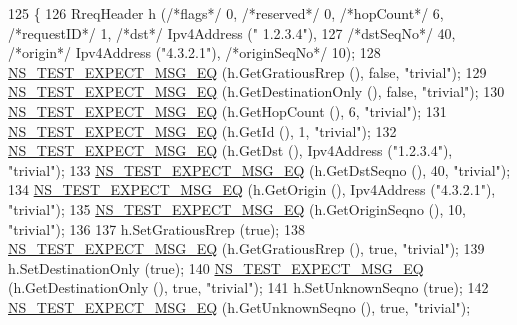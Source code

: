 \begin{DoxyCode}
125   \{
126     RreqHeader h (\textcolor{comment}{/*flags*/} 0, \textcolor{comment}{/*reserved*/} 0, \textcolor{comment}{/*hopCount*/} 6, \textcolor{comment}{/*requestID*/} 1, \textcolor{comment}{/*dst*/} Ipv4Address (\textcolor{stringliteral}{"
      1.2.3.4"}),
127                             \textcolor{comment}{/*dstSeqNo*/} 40, \textcolor{comment}{/*origin*/} Ipv4Address (\textcolor{stringliteral}{"4.3.2.1"}), \textcolor{comment}{/*originSeqNo*/} 10);
128     \hyperlink{group__testing_ga7304ba46a28d8cf08dfdfd6499cf7068}{NS\_TEST\_EXPECT\_MSG\_EQ} (h.GetGratiousRrep (), \textcolor{keyword}{false}, \textcolor{stringliteral}{"trivial"});
129     \hyperlink{group__testing_ga7304ba46a28d8cf08dfdfd6499cf7068}{NS\_TEST\_EXPECT\_MSG\_EQ} (h.GetDestinationOnly (), \textcolor{keyword}{false}, \textcolor{stringliteral}{"trivial"});
130     \hyperlink{group__testing_ga7304ba46a28d8cf08dfdfd6499cf7068}{NS\_TEST\_EXPECT\_MSG\_EQ} (h.GetHopCount (), 6, \textcolor{stringliteral}{"trivial"});
131     \hyperlink{group__testing_ga7304ba46a28d8cf08dfdfd6499cf7068}{NS\_TEST\_EXPECT\_MSG\_EQ} (h.GetId (), 1, \textcolor{stringliteral}{"trivial"});
132     \hyperlink{group__testing_ga7304ba46a28d8cf08dfdfd6499cf7068}{NS\_TEST\_EXPECT\_MSG\_EQ} (h.GetDst (), Ipv4Address (\textcolor{stringliteral}{"1.2.3.4"}), \textcolor{stringliteral}{"trivial"});
133     \hyperlink{group__testing_ga7304ba46a28d8cf08dfdfd6499cf7068}{NS\_TEST\_EXPECT\_MSG\_EQ} (h.GetDstSeqno (), 40, \textcolor{stringliteral}{"trivial"});
134     \hyperlink{group__testing_ga7304ba46a28d8cf08dfdfd6499cf7068}{NS\_TEST\_EXPECT\_MSG\_EQ} (h.GetOrigin (), Ipv4Address (\textcolor{stringliteral}{"4.3.2.1"}), \textcolor{stringliteral}{"trivial"});
135     \hyperlink{group__testing_ga7304ba46a28d8cf08dfdfd6499cf7068}{NS\_TEST\_EXPECT\_MSG\_EQ} (h.GetOriginSeqno (), 10, \textcolor{stringliteral}{"trivial"});
136 
137     h.SetGratiousRrep (\textcolor{keyword}{true});
138     \hyperlink{group__testing_ga7304ba46a28d8cf08dfdfd6499cf7068}{NS\_TEST\_EXPECT\_MSG\_EQ} (h.GetGratiousRrep (), \textcolor{keyword}{true}, \textcolor{stringliteral}{"trivial"});
139     h.SetDestinationOnly (\textcolor{keyword}{true});
140     \hyperlink{group__testing_ga7304ba46a28d8cf08dfdfd6499cf7068}{NS\_TEST\_EXPECT\_MSG\_EQ} (h.GetDestinationOnly (), \textcolor{keyword}{true}, \textcolor{stringliteral}{"trivial"});
141     h.SetUnknownSeqno (\textcolor{keyword}{true});
142     \hyperlink{group__testing_ga7304ba46a28d8cf08dfdfd6499cf7068}{NS\_TEST\_EXPECT\_MSG\_EQ} (h.GetUnknownSeqno (), \textcolor{keyword}{true}, \textcolor{stringliteral}{"trivial"});

\end{DoxyCode}
